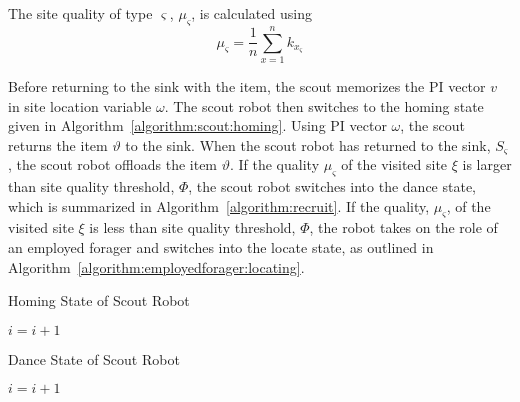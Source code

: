The site quality of type $\varsigma$, $\mu_\varsigma$, is calculated using
\begin{equation}
\label{density}
\mu_\varsigma = \frac{1}{n}\sum\limits_{x=1}^n k_{x_\varsigma}
\end{equation}
 
Before returning to the sink with the item, the scout memorizes the PI vector $v$ in site location variable $\omega$. The scout robot then switches to the homing state given in Algorithm~\ref{algorithm:scout:homing}. Using PI vector $\omega$, the scout returns the item $\vartheta$ to the sink. When the scout robot has returned to the sink, $S_\varsigma$, the scout robot offloads the item $\vartheta$. If the quality $\mu_\varsigma$ of the visited site $\xi$ is larger than site quality threshold, $\Phi$, the scout robot switches into the dance state, which is summarized in Algorithm~\ref{algorithm:recruit}. If the quality, $\mu_\varsigma$, of the visited site $\xi$ is less than site quality threshold, $\Phi$, the robot takes on the role of an employed forager and switches into the locate state, as outlined in Algorithm~\ref{algorithm:employedforager:locating}.


\begin{algorithm}
\caption{Homing State of Scout Robot}
\label{algorithm:scout:homing}
\begin{algorithmic}[1]
	\State {}
		\State {}
	\Else 
		\State {}
		\State {}
	\EndIf
\Else
		\State {}
	\EndIf
\EndIf
\State $i =i + 1$
\EndFunction
\end{algorithmic}
\end{algorithm}


\begin{algorithm}
\caption{Dance State of Scout Robot}
\label{algorithm:recruit}
\begin{algorithmic}[1]
	\State {} 
\Else 
	\State {}
	\If {$\varrho < \rho$} 
	\Else
	\EndIf
\EndIf
\State $i =i + 1$
\EndFunction
\end{algorithmic}
\end{algorithm}


